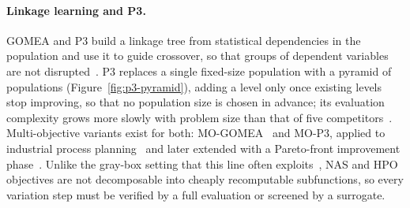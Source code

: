 
\paragraph{Linkage learning and P3.} GOMEA and P3 build a linkage tree from statistical dependencies in the
population and use it to guide crossover, so that groups of dependent variables are not
disrupted~\citep{thierens2011optimal,goldman2014parameterless}. P3 replaces a single fixed-size population with a
pyramid of populations (Figure~\ref{fig:p3-pyramid}), adding a level only once existing levels stop improving, so that no population size is
chosen in advance; its evaluation complexity grows more slowly with problem size than that of five
competitors~\citep{goldman2015fast}. Multi-objective variants exist for both: MO-GOMEA~\citep{luong2014mogomea}
and MO-P3, applied to industrial process planning~\citep{przewozniczek2021mop3} and later extended with a Pareto-front
improvement phase~\citep{niemczyk2025pareto}. Unlike the gray-box setting that this line often
exploits~\citep{whitley2016graybox,bouter2023library}, NAS and HPO objectives are not decomposable into cheaply
recomputable subfunctions, so every variation step must be verified by a full evaluation or screened by a surrogate.

